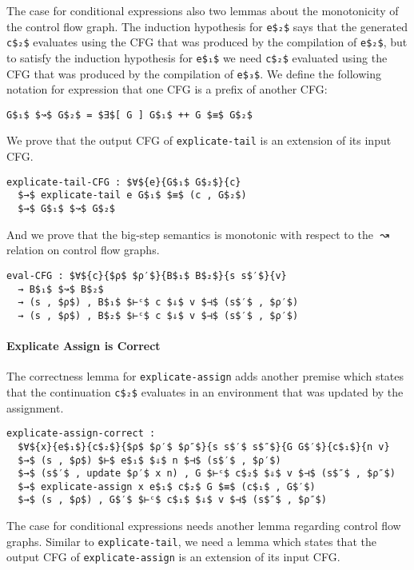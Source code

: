\documentclass[sigplan,review,dvipsnames,screen,10pt]{acmart}
\begin{document}
The case for conditional expressions also two lemmas about the
monotonicity of the control flow graph.  The induction hypothesis for
\lstinline{e$₂$} says that the generated \lstinline{c$₂$} evaluates
using the CFG that was produced by the compilation of
\lstinline{e$₂$}, but to satisfy the induction hypothesis
for \lstinline{e$₁$} we need \lstinline{c$₂$} evaluated using the CFG
that was produced by the compilation of \lstinline{e$₃$}.
We define the following notation for
expression that one CFG is a prefix of another CFG:
\begin{lstlisting}
G$₁$ $↝$ G$₂$ = $∃$[ G ] G$₁$ ++ G $≡$ G$₂$
\end{lstlisting}
\noindent We prove that the output CFG of \lstinline{explicate-tail} is
an extension of its input CFG.
\begin{lstlisting}
explicate-tail-CFG : $∀${e}{G$₁$ G$₂$}{c}
  $→$ explicate-tail e G$₁$ $≡$ (c , G$₂$)
  $→$ G$₁$ $↝$ G$₂$
\end{lstlisting}
\noindent And we prove that the big-step semantics is monotonic with
respect to the $↝$ relation on control flow graphs.
\begin{lstlisting}
eval-CFG : $∀${c}{$ρ$ $ρ′$}{B$₁$ B$₂$}{s s$′$}{v}
  → B$₁$ $↝$ B$₂$
  → (s , $ρ$) , B$₁$ $⊢ᶜ$ c $⇓$ v $⊣$ (s$′$ , $ρ′$)
  → (s , $ρ$) , B$₂$ $⊢ᶜ$ c $⇓$ v $⊣$ (s$′$ , $ρ′$)
\end{lstlisting}


\paragraph{Explicate Assign is Correct}

The correctness lemma for \lstinline{explicate-assign} adds another
premise which states that the continuation \lstinline{c$₂$} evaluates
in an environment that was updated by the assignment.

\begin{lstlisting}
explicate-assign-correct :
  $∀${x}{e$₁$}{c$₂$}{$ρ$ $ρ′$ $ρ″$}{s s$′$ s$″$}{G G$′$}{c$₁$}{n v}
  $→$ (s , $ρ$) $⊢$ e$₁$ $⇓$ n $⊣$ (s$′$ , $ρ′$)
  $→$ (s$′$ , update $ρ′$ x n) , G $⊢ᶜ$ c$₂$ $⇓$ v $⊣$ (s$″$ , $ρ″$)
  $→$ explicate-assign x e$₁$ c$₂$ G $≡$ (c$₁$ , G$′$)
  $→$ (s , $ρ$) , G$′$ $⊢ᶜ$ c$₁$ $⇓$ v $⊣$ (s$″$ , $ρ″$)
\end{lstlisting}

\noindent The case for conditional expressions needs another lemma
regarding control flow graphs. Similar to \lstinline{explicate-tail},
we need a lemma which states that the output CFG of
\lstinline{explicate-assign} is an extension of its input CFG.
\end{document}
